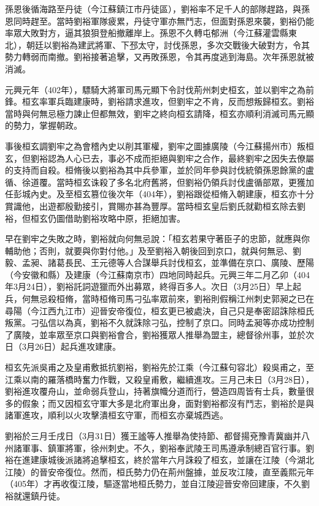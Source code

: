 孫恩後循海路至丹徒（今江蘇鎮江市丹徒區），劉裕率不足千人的部隊趕路，與孫恩同時趕至。當時劉裕軍隊疲累，丹徒守軍亦無鬥志，但面對孫恩來襲，劉裕仍能率眾大敗對方，逼其狼狽登船撤離岸上。孫恩不久轉屯郁洲（今江蘇灌雲縣東北），朝廷以劉裕為建武將軍、下邳太守，討伐孫恩，多次交戰後大破對方，令其勢力轉弱而南撤。劉裕接著追擊，又再敗孫恩，令其再度逃到海島。次年孫恩就被消滅。

元興元年（402年），驃騎大將軍司馬元顯下令討伐荊州刺史桓玄，並以劉牢之為前鋒。桓玄率軍兵臨建康時，劉裕請求進攻，但劉牢之不肯，反而想叛歸桓玄。劉裕當時與何無忌極力諫止但都無效，劉牢之終向桓玄請降，桓玄亦順利消滅司馬元顯的勢力，掌握朝政。

事後桓玄調劉牢之為會稽內史以削其軍權，劉牢之圖據廣陵（今江蘇揚州市）叛桓玄，但劉裕認為人心已去，事必不成而拒絕與劉牢之合作，最終劉牢之因失去僚屬的支持而自殺。桓脩後以劉裕為其中兵參軍，並於同年參與討伐統領孫恩餘黨的盧循、徐道覆。當時桓玄诛殺了多名北府舊將，但劉裕仍領兵討伐盧循部眾，更獲加任彭城內史。及至桓玄篡位後次年（404年），劉裕跟從桓脩入朝建康，桓玄亦十分賞識他，出遊都殷勤接引，賞賜亦甚為豐厚。當時桓玄皇后劉氏就勸桓玄除去劉裕，但桓玄仍圖借助劉裕攻略中原，拒絕加害。

早在劉牢之失敗之時，劉裕就向何無忌說：「桓玄若果守著臣子的忠節，就應與你輔助他；否則，就要與你對付他。」及至劉裕入朝後回到京口，就與何無忌、劉毅、孟昶、諸葛長民、王元德等人合謀舉兵討伐桓玄，並準備在京口、廣陵、歷陽（今安徽和縣）及建康（今江蘇南京市）四地同時起兵。元興三年二月乙卯（404年3月24日），劉裕託詞遊獵而外出募眾，終得百多人。次日（3月25日）早上起兵，何無忌殺桓脩，當時桓脩司馬刁弘率眾前來，劉裕則假稱江州刺史郭昶之已在尋陽（今江西九江市）迎晉安帝復位，桓玄更已被處決，自己只是奉密詔誅除桓氏叛黨。刁弘信以為真，劉裕不久就誅除刁弘，控制了京口。同時孟昶等亦成功控制了廣陵，並率眾至京口與劉裕會合，劉裕獲眾人推舉為盟主，總督徐州事，並於次日（3月26日）起兵進攻建康。

桓玄先派吳甫之及皇甫敷抵抗劉裕，劉裕先於江乘（今江蘇句容北）殺吳甫之，至江乘以南的羅落橋時奮力作戰，又殺皇甫敷，繼續進攻。三月己未日（3月28日），劉裕進攻覆舟山，並命弱兵登山，持著旗幟分道而行，營造四周皆有士兵，數量很多的假象；而又因桓玄守軍大多是北府軍出身，面對劉裕都沒有鬥志，劉裕於是與諸軍進攻，順利以火攻擊潰桓玄守軍，而桓玄亦棄城西逃。

劉裕於三月壬戌日（3月31日）獲王謐等人推舉為使持節、都督揚兗豫青冀幽并八州諸軍事、鎮軍將軍，徐州刺史。不久，劉裕奉武陵王司馬遵承制總百官行事。劉裕在進建康城後派諸將追擊桓玄，終於當年六月誅殺了桓玄，並讓在江陵（今湖北江陵）的晉安帝復位。然而，桓氏勢力仍在荊州盤據，並反攻江陵，直至義熙元年（405年）才再收復江陵，驅逐當地桓氏勢力，並自江陵迎晉安帝回建康，不久劉裕就還鎮丹徒。

